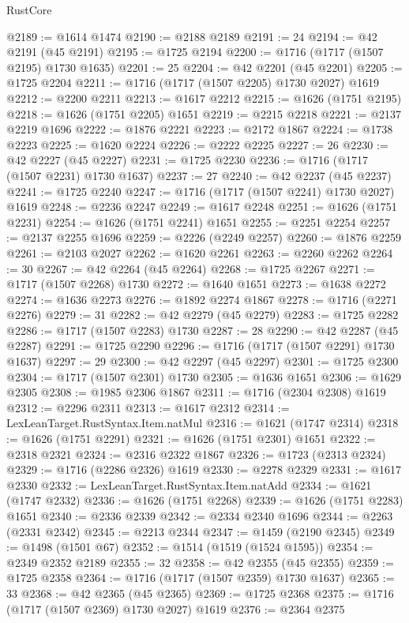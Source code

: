 \begin{lexlean}{RustCore}
\begin{coremodule}
@2189 := @1614 @1474
@2190 := @2188 @2189
@2191 := 24
@2194 := @42 @2191 (@45 @2191)
@2195 := @1725 @2194
@2200 := @1716 (@1717 (@1507 @2195) @1730 @1635)
@2201 := 25
@2204 := @42 @2201 (@45 @2201)
@2205 := @1725 @2204
@2211 := @1716 (@1717 (@1507 @2205) @1730 @2027) @1619
@2212 := @2200 @2211
@2213 := @1617 @2212
@2215 := @1626 (@1751 @2195)
@2218 := @1626 (@1751 @2205) @1651
@2219 := @2215 @2218
@2221 := @2137 @2219 @1696
@2222 := @1876 @2221
@2223 := @2172 @1867
@2224 := @1738 @2223
@2225 := @1620 @2224
@2226 := @2222 @2225
@2227 := 26
@2230 := @42 @2227 (@45 @2227)
@2231 := @1725 @2230
@2236 := @1716 (@1717 (@1507 @2231) @1730 @1637)
@2237 := 27
@2240 := @42 @2237 (@45 @2237)
@2241 := @1725 @2240
@2247 := @1716 (@1717 (@1507 @2241) @1730 @2027) @1619
@2248 := @2236 @2247
@2249 := @1617 @2248
@2251 := @1626 (@1751 @2231)
@2254 := @1626 (@1751 @2241) @1651
@2255 := @2251 @2254
@2257 := @2137 @2255 @1696
@2259 := @2226 (@2249 @2257)
@2260 := @1876 @2259
@2261 := @2103 @2027
@2262 := @1620 @2261
@2263 := @2260 @2262
@2264 := 30
@2267 := @42 @2264 (@45 @2264)
@2268 := @1725 @2267
@2271 := @1717 (@1507 @2268) @1730
@2272 := @1640 @1651
@2273 := @1638 @2272
@2274 := @1636 @2273
@2276 := @1892 @2274 @1867
@2278 := @1716 (@2271 @2276)
@2279 := 31
@2282 := @42 @2279 (@45 @2279)
@2283 := @1725 @2282
@2286 := @1717 (@1507 @2283) @1730
@2287 := 28
@2290 := @42 @2287 (@45 @2287)
@2291 := @1725 @2290
@2296 := @1716 (@1717 (@1507 @2291) @1730 @1637)
@2297 := 29
@2300 := @42 @2297 (@45 @2297)
@2301 := @1725 @2300
@2304 := @1717 (@1507 @2301) @1730
@2305 := @1636 @1651
@2306 := @1629 @2305
@2308 := @1985 @2306 @1867
@2311 := @1716 (@2304 @2308) @1619
@2312 := @2296 @2311
@2313 := @1617 @2312
@2314 := LexLeanTarget.RustSyntax.Item.natMul
@2316 := @1621 (@1747 @2314)
@2318 := @1626 (@1751 @2291)
@2321 := @1626 (@1751 @2301) @1651
@2322 := @2318 @2321
@2324 := @2316 @2322 @1867
@2326 := @1723 (@2313 @2324)
@2329 := @1716 (@2286 @2326) @1619
@2330 := @2278 @2329
@2331 := @1617 @2330
@2332 := LexLeanTarget.RustSyntax.Item.natAdd
@2334 := @1621 (@1747 @2332)
@2336 := @1626 (@1751 @2268)
@2339 := @1626 (@1751 @2283) @1651
@2340 := @2336 @2339
@2342 := @2334 @2340 @1696
@2344 := @2263 (@2331 @2342)
@2345 := @2213 @2344
@2347 := @1459 (@2190 @2345)
@2349 := @1498 (@1501 @67)
@2352 := @1514 (@1519 (@1524 @1595))
@2354 := @2349 @2352 @2189
@2355 := 32
@2358 := @42 @2355 (@45 @2355)
@2359 := @1725 @2358
@2364 := @1716 (@1717 (@1507 @2359) @1730 @1637)
@2365 := 33
@2368 := @42 @2365 (@45 @2365)
@2369 := @1725 @2368
@2375 := @1716 (@1717 (@1507 @2369) @1730 @2027) @1619
@2376 := @2364 @2375

\end{coremodule}
\end{lexlean}
